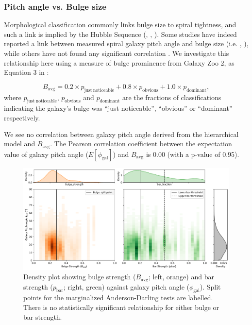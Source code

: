 \subsubsection{Pitch angle vs. Bulge size}

Morphological classification commonly links bulge size to spiral tightness, and such a link is implied by the Hubble Sequence (\citealt{2005ARA&A..43..581S}, \citealt{2009MNRAS.393.1531G}, \citealt{2013seg..book..155B}). Some studies have indeed reported a link between measured spiral galaxy pitch angle and bulge size (i.e. \citealt{2017MNRAS.472.2263H}, \citealt{2019ApJ...873...85D}), while others have not found any significant correlation \citep{2019MNRAS.487.1808M}. We investigate this relationship here using a measure of bulge prominence from Galaxy Zoo 2, as Equation 3 in \citet{2019MNRAS.487.1808M}:

\begin{equation}
  B_\mathrm{avg} = 0.2\times p_\mathrm{just\ noticeable} + 0.8\times p_\mathrm{obvious} + 1.0\times p_\mathrm{dominant},
\end{equation}
where $p_\mathrm{just\ noticeable}$, $p_\mathrm{obvious}$ and $p_\mathrm{dominant}$ are the fractions of classifications indicating the galaxy's bulge was ``just noticeable'', ``obvious'' or ``dominant'' respectively.

We see no correlation between galaxy pitch angle derived from the hierarchical model and $B_\mathrm{avg}$. The Pearson correlation coefficient between the expectation value of galaxy pitch angle ($E[\phi_\mathrm{gal}]$) and $B_\mathrm{avg}$ is 0.00 (with a p-value of 0.95).

\begin{figure}
  \includegraphics[width=17.7cm]{plots/bulge_bar_phigal_distribution.pdf}
  \caption{Density plot showing bulge strength ($B_\mathrm{avg}$; left, orange) and bar strength ($p_\mathrm{bar}$; right, green) against galaxy pitch angle ($\phi_\mathrm{gal}$). Split points for the marginalized Anderson-Darling tests are labelled. There is no statistically significant relationship for either bulge or bar strength.}
  \label{fig:bulge-bar-pa-hist}
\end{figure}

